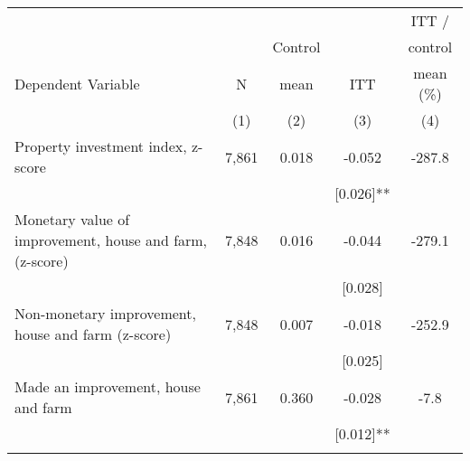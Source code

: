 \begin{tabular}{lcccc}
\hline \noalign{\smallskip} &  &  &  & ITT /\\
 &  & Control &  & control\\
Dependent Variable & N & mean & ITT & mean (\%)\\
 & (1) & (2) & (3) & (4)\\
\noalign{\smallskip}\hline \noalign{\smallskip}Property investment index, z-score & 7,861 & 0.018 & -0.052 & -287.8\\
 &  &  & [0.026]** & \\
\quad Monetary value of improvement, house and farm, (z-score) & 7,848 & 0.016 & -0.044 & -279.1\\
 &  &  & [0.028] & \\
\quad Non-monetary improvement, house and farm (z-score) & 7,848 & 0.007 & -0.018 & -252.9\\
 &  &  & [0.025] & \\
\quad Made an improvement, house and farm & 7,861 & 0.360 & -0.028 & -7.8\\
 &  &  & [0.012]** & \\
\noalign{\smallskip}\hline\end{tabular}
